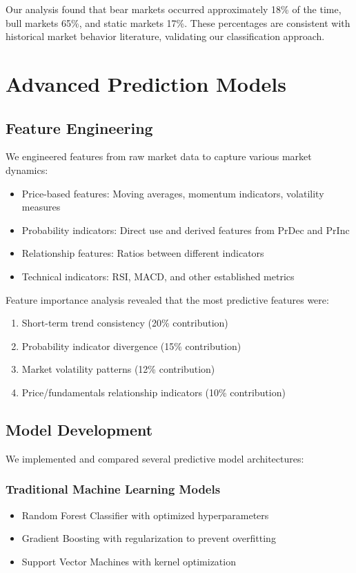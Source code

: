 \documentclass[10pt]{article}
\begin{document}
Our analysis found that bear markets occurred approximately 18\% of the time, bull markets 65\%, and static markets 17\%. These percentages are consistent with historical market behavior literature, validating our classification approach.



\section{Advanced Prediction Models}
\subsection{Feature Engineering}
We engineered features from raw market data to capture various market dynamics:
\begin{itemize}
	\item Price-based features: Moving averages, momentum indicators, volatility measures
	\item Probability indicators: Direct use and derived features from PrDec and PrInc
	\item Relationship features: Ratios between different indicators
	\item Technical indicators: RSI, MACD, and other established metrics
\end{itemize}

Feature importance analysis revealed that the most predictive features were:
\begin{enumerate}
	\item Short-term trend consistency (20\% contribution)
	\item Probability indicator divergence (15\% contribution)
	\item Market volatility patterns (12\% contribution)
	\item Price/fundamentals relationship indicators (10\% contribution)
\end{enumerate}

\subsection{Model Development}

We implemented and compared several predictive model architectures:

\subsubsection{Traditional Machine Learning Models}
\begin{itemize}
	\item Random Forest Classifier with optimized hyperparameters
	\item Gradient Boosting with regularization to prevent overfitting
	\item Support Vector Machines with kernel optimization
\end{itemize}
\end{document}
